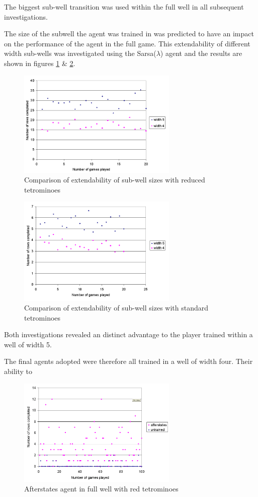 \documentclass{rucsthesis}
\begin{document}
The biggest sub-well transition was used within the full well in all subsequent investigations. 

The size of the subwell the agent was trained in was predicted to have an impact on the performance of the agent in the full game. This extendability of different width sub-wells was investigated using the Sarsa($\lambda$) agent and the results are shown in figures \ref{fig:widthcomparrison} \& \ref{fig:widthcomparrisonfulltet}.

\begin{figure}[h]
\centering
\includegraphics[width=3in]{widthcomparrison.png}
\caption{Comparison of extendability of sub-well sizes with reduced tetrominoes}
\label{fig:widthcomparrison}
\end{figure}

\begin{figure}[h]
\centering
\includegraphics[width=3in]{widthcomparrisonfulltet.png}
\caption{Comparison of extendability of sub-well sizes with standard tetrominoes}
\label{fig:widthcomparrisonfulltet}
\end{figure}

Both investigations revealed an distinct advantage to the player trained within a well of width 5.

The final agents adopted were therefore all trained in a well of width four.
Their ability to 

\begin{figure}[h]
\centering
\includegraphics[width=3in]{afterstatesredtetfullwell.png}
\caption{Afterstates agent in full well with red tetrominoes}
\label{fig:afterstatesredtetfullwell}
\end{figure}
\end{document}
